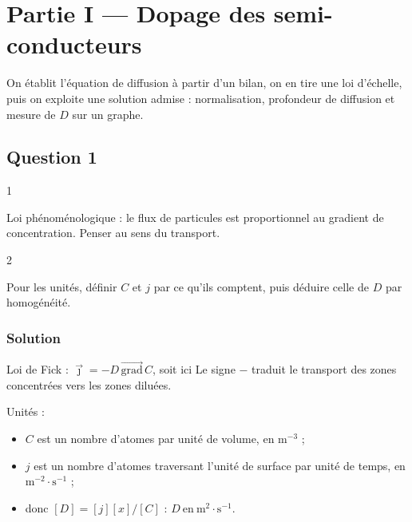 \documentclass[11pt,a4paper]{article}
\providecommand{\tightlist}{\setlength{\itemsep}{0pt}\setlength{\parskip}{0pt}}
\newcommand{\equationajustee}[1]{%
  \sbox{\boiteequation}{$\displaystyle #1$}%
  \ifdim\wd\boiteequation>\linewidth
    \[\resizebox{\linewidth}{!}{\usebox{\boiteequation}}\]%
  \else
    \[#1\]%
  \fi}
\begin{document}
\hypertarget{partie-i-dopage-des-semi-conducteurs}{%
\section{Partie I --- Dopage des semi-conducteurs}\label{partie-i-dopage-des-semi-conducteurs}}

On établit l'équation de diffusion à partir d'un bilan, on en tire une loi d'échelle, puis on exploite une solution admise : normalisation, profondeur de diffusion et mesure de \(D\) sur un graphe.

\hypertarget{question-1}{%
\subsection{Question 1}\label{question-1}}

\begin{indication}{1}

Loi phénoménologique : le flux de particules est proportionnel au gradient de concentration. Penser au sens du transport.

\end{indication}

\begin{indication}{2}

Pour les unités, définir \(C\) et \(j\) par ce qu'ils comptent, puis déduire celle de \(D\) par homogénéité.

\end{indication}

\hypertarget{solution}{%
\subsubsection{Solution}\label{solution}}

Loi de Fick : \(\vec\jmath=-D\,\overrightarrow{\mathrm{grad}}\,C\), soit ici
\equationajustee{\boxed{j(x,t)=-D\,\frac{\partial C}{\partial x}(x,t)}}
Le signe \(-\) traduit le transport des zones concentrées vers les zones diluées.

Unités :

\begin{itemize}
\tightlist
\item
  \(C\) est un nombre d'atomes par unité de volume, en \(\mathrm{m^{-3}}\) ;
\item
  \(j\) est un nombre d'atomes traversant l'unité de surface par unité de temps, en \(\mathrm{m^{-2}\cdot s^{-1}}\) ;
\item
  donc \([D]=[j][x]/[C]\) : \(\boxed{D\ \text{en}\ \mathrm{m^2\cdot s^{-1}}}\).
\end{itemize}
\end{document}
